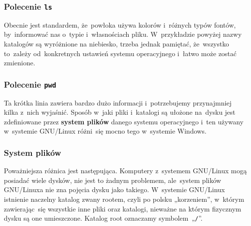 \documentclass[10pt,t]{beamer}
\begin{document}
\begin{frame}
  \frametitle{Polecenie \texttt{ls}}




  Obecnie jest standardem, że~powłoka używa kolorów i~różnych typów fontów,
  by~informować nas o~typie i~własnościach pliku. W~przykładzie powyżej
  nazwy katalogów są wyróżnione na niebiesko, trzeba jednak pamiętać,
  że~wszystko to~zależy od~konkretnych ustawień systemu operacyjnego
  i~łatwo może zostać zmienione.

\end{frame}





\begin{frame}
  \frametitle{Polecenie \texttt{pwd}}




  Ta krótka linia zawiera bardzo dużo informacji i~potrzebujemy przynajmniej
  kilka z~nich wyjaśnić. Sposób w~jaki pliki i~katalogi są ułożone na~dysku
  jest zdefiniowane przez \textbf{system plików} danego systemu
  operacyjnego i~ten używany w~systemie GNU/Linux różni~się mocno tego
  w~systemie Windows.

\end{frame}





\begin{frame}
  \frametitle{System plików}




  Poważniejsza różnica jest następująca. Komputery z~systemem GNU/Linux
  mogą posiadać wiele dysków, nie jest to żadnym problemem, ale~system
  plików GNU/Linuxa nie zna pojęcia dysku jako takiego. W~systemie GNU/Linux
  istnienie naczelny katalog zwany rootem, czyli po polsku „korzeniem”,
  w~którym zawierając~się wszystkie inne pliki oraz katalogi, nieważne na
  którym fizycznym dysku są one umieszczone. Katalog root oznaczamy
  symbolem~„\texttt{/}”.

\end{frame}







\end{document}
